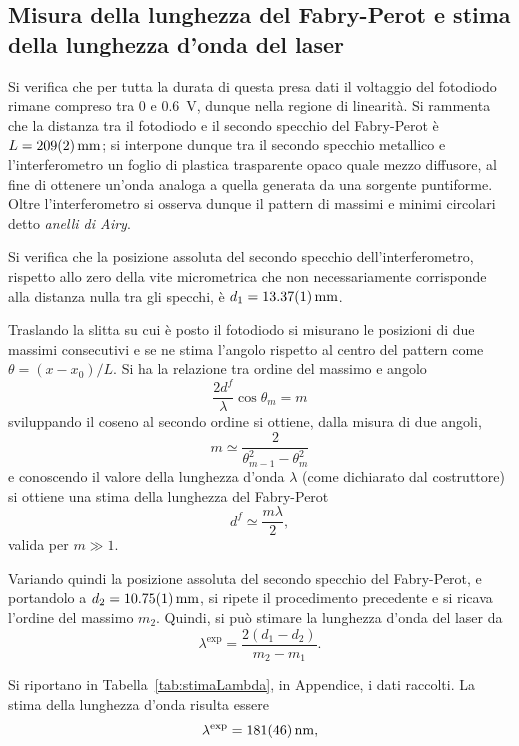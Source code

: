 \documentclass[10pt,oneside,a4paper]{article}
\begin{document}
\begin{multicols}{2}
\section{Misura della lunghezza del Fabry-Perot e stima della lunghezza d'onda del laser}
Si verifica che per tutta la durata di questa presa dati il voltaggio del fotodiodo rimane compreso tra \SI{0}{} e \SI{0.6}{V}, dunque nella regione di linearità. Si rammenta che la distanza tra il fotodiodo e il secondo specchio del Fabry-Perot è $L=\SI{209 \pm 2}{mm}$; si interpone dunque tra il secondo specchio metallico e l'interferometro un foglio di plastica trasparente opaco quale mezzo diffusore, al fine di ottenere un'onda analoga a quella generata da una sorgente puntiforme. Oltre l'interferometro si osserva dunque il pattern di massimi e minimi circolari detto \emph{anelli di Airy}.

Si verifica che la posizione assoluta del secondo specchio dell'interferometro, rispetto allo zero della vite micrometrica che non necessariamente corrisponde alla distanza nulla tra gli specchi, è $d_1 = \SI{13.37 \pm 0.01}{mm}$.

Traslando la slitta su cui è posto il fotodiodo si misurano le posizioni di due massimi consecutivi e se ne stima l'angolo rispetto al centro del pattern come $\theta = (x-x_0) / L$. Si ha la relazione tra ordine del massimo e angolo 
\begin{equation}\label{eq:diff}
\frac{2d^f}{\lambda} \cos{\theta_m} = m
\end{equation}
sviluppando il coseno al secondo ordine si ottiene, dalla misura di due angoli,
\[
m \simeq \frac{2}{\theta_{m-1}^2 - \theta_{m}^2}
\]
e conoscendo il valore della lunghezza d'onda $\lambda$ (come dichiarato dal costruttore) si ottiene una stima della lunghezza del Fabry-Perot
\[
d^f \simeq \frac{m \lambda}{2},
\]
valida per $m \gg 1$.

Variando quindi la posizione assoluta del secondo specchio del Fabry-Perot, e portandolo a $d_2 = \SI{10.75 \pm 0.01}{mm}$, si ripete il procedimento precedente e si ricava l'ordine del massimo $m_2$. Quindi, si può stimare la lunghezza d'onda del laser da \[
\lambda^{\text{exp}} = \frac{2(d_1 - d_2)}{m_2 - m_1}.
\]

Si riportano in Tabella~\ref{tab:stimaLambda}, in Appendice, i dati raccolti. La stima della lunghezza d'onda risulta essere
\[
\lambda^{\text{exp}} = \SI{ 181 \pm 46}{nm},
\]


\end{multicols}
\end{document}

